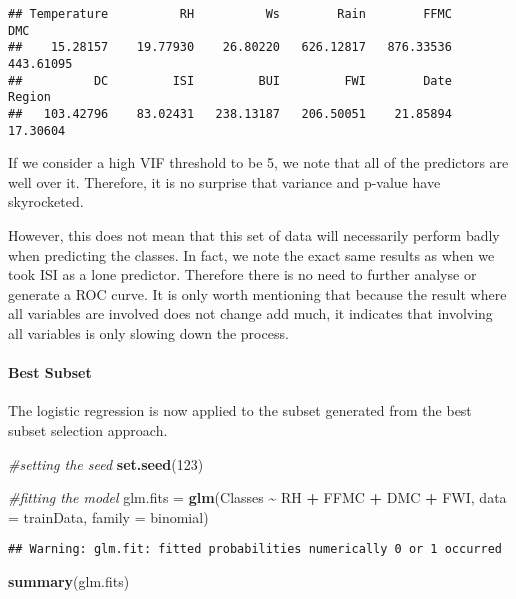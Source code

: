 \documentclass[
]{article}
\newenvironment{Shaded}{\begin{snugshade}}{\end{snugshade}}
\newcommand{\AttributeTok}[1]{\textcolor[rgb]{0.13,0.29,0.53}{#1}}
\newcommand{\CommentTok}[1]{\textcolor[rgb]{0.56,0.35,0.01}{\textit{#1}}}
\newcommand{\DecValTok}[1]{\textcolor[rgb]{0.00,0.00,0.81}{#1}}
\newcommand{\FunctionTok}[1]{\textcolor[rgb]{0.13,0.29,0.53}{\textbf{#1}}}
\newcommand{\NormalTok}[1]{#1}
\newcommand{\OtherTok}[1]{\textcolor[rgb]{0.56,0.35,0.01}{#1}}
\newcommand{\SpecialCharTok}[1]{\textcolor[rgb]{0.81,0.36,0.00}{\textbf{#1}}}
\begin{document}
\begin{verbatim}
## Temperature          RH          Ws        Rain        FFMC         DMC 
##    15.28157    19.77930    26.80220   626.12817   876.33536   443.61095 
##          DC         ISI         BUI         FWI        Date      Region 
##   103.42796    83.02431   238.13187   206.50051    21.85894    17.30604
\end{verbatim}

If we consider a high VIF threshold to be 5, we note that all of the
predictors are well over it. Therefore, it is no surprise that variance
and p-value have skyrocketed.

However, this does not mean that this set of data will necessarily
perform badly when predicting the classes. In fact, we note the exact
same results as when we took ISI as a lone predictor. Therefore there is
no need to further analyse or generate a ROC curve. It is only worth
mentioning that because the result where all variables are involved does
not change add much, it indicates that involving all variables is only
slowing down the process.

\paragraph{Best Subset}\label{best-subset}

The logistic regression is now applied to the subset generated from the
best subset selection approach.

\begin{Shaded}
\begin{Highlighting}[]
\CommentTok{\#setting the seed}
\FunctionTok{set.seed}\NormalTok{(}\DecValTok{123}\NormalTok{)}

\CommentTok{\#fitting the model}
\NormalTok{glm.fits }\OtherTok{=} \FunctionTok{glm}\NormalTok{(Classes }\SpecialCharTok{\textasciitilde{}}\NormalTok{ RH }\SpecialCharTok{+}\NormalTok{ FFMC }\SpecialCharTok{+}\NormalTok{ DMC }\SpecialCharTok{+}\NormalTok{ FWI, }\AttributeTok{data =}\NormalTok{ trainData, }\AttributeTok{family =}\NormalTok{ binomial)}
\end{Highlighting}
\end{Shaded}

\begin{verbatim}
## Warning: glm.fit: fitted probabilities numerically 0 or 1 occurred
\end{verbatim}

\begin{Shaded}
\begin{Highlighting}[]
\FunctionTok{summary}\NormalTok{(glm.fits)}
\end{Highlighting}
\end{Shaded}
\end{document}
